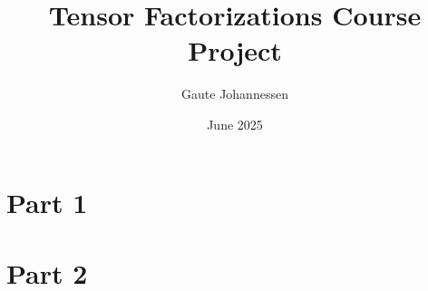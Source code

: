 \documentclass[10pt]{article}
\title{Tensor Factorizations Course Project}
\author{Gaute Johannessen}
\date{June 2025}
\begin{document}
\maketitle

\section*{Part 1}



\section*{Part 2}



\printbibliography
\end{document}
